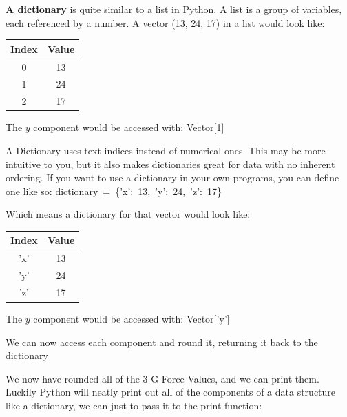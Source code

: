\documentclass[a4paper, twocolumn, twoside, 12pt]{article}
\newenvironment{aside}
		{
		\begin{mdframed}[
			style=0,%
			leftline=false,
			rightline=false,
			innerbottommargin=2pt,
			innerleftmargin=12pt,
			innerrightmargin=0pt,
			linewidth=0.75pt,
			skipabove=6pt,
			skipbelow=6pt
			]
				\small
				\color{JungleGreen}
				\setlength{\parskip}{2pt}
				\vspace{2pt} %
		}
		{
		\end{mdframed}
		}
\begin{document}
			\begin{aside}
				\textbf{A dictionary} is quite similar to a list in Python. A list is a group of variables, each referenced by a number. A vector (13, 24, 17) in a list would look like:
				
				\color{Black}
				\begin{tabular}{|c|c|}
					\hline Index & Value \\ 
					\hline 0 & 13 \\ 
					\hline 1 & 24 \\ 
					\hline 2 & 17 \\ 
					\hline 
				\end{tabular} 
				\color{JungleGreen}
				
				The $y$ component would be accessed with: \mbox{Vector[1]}
				
				A Dictionary uses text indices instead of numerical ones. This may be more intuitive to you, but it also makes dictionaries great for data with no inherent ordering. If you want to use a dictionary in your own programs, you can define one like so:
				\mbox{dictionary = \{'x': 13, 'y': 24, 'z': 17\}}
				
				Which means a dictionary for that vector would look like:

				\color{Black}
				\begin{tabular}{|c|c|}
					\hline Index & Value \\ 
					\hline 'x' & 13 \\ 
					\hline 'y' & 24 \\ 
					\hline 'z' & 17 \\ 
					\hline 
				\end{tabular}
				\color{JungleGreen}
				
				The $y$ component would be accessed with: \mbox{Vector['y']}	
			\end{aside}
			
			We can now access each component and round it, returning it back to the dictionary
			
			
			
			We now have rounded all of the 3 G-Force Values, and we can print them.
			Luckily Python will neatly print out all of the components of a data structure like a dictionary, we can just to pass it to the print function:
			
			
\end{document}

